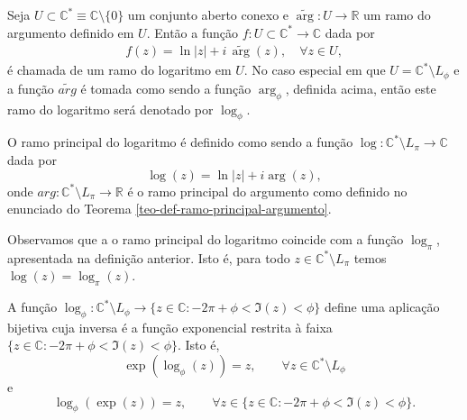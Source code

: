 \bigskip 



\begin{definicao}
\label{def-ramo-logaritmo}
Seja $U\subset \mathbb{C}^{*}\equiv \mathbb{C}\setminus\{0\}$ um conjunto aberto conexo e $\widetilde{\arg}:U\to\mathbb{R}$ um ramo do argumento definido em $U$. Então a função $f:U\subset \mathbb{C}^{*}\to\mathbb{C}$ dada por 
\begin{align}\label{def-eq-ramo-log}
f(z) = \ln |z|+ i\,\widetilde{\arg}(z), \quad \forall z\in U,
\end{align}
é chamada de um ramo do logaritmo em $U$. No caso especial em que  
$U=\mathbb{C}^{*}\setminus L_{\phi}$ 
e a função $\widetilde{arg}$ é tomada como sendo a função $\arg_{\phi}$, definida acima, então este ramo do logaritmo será denotado 
por $\log_{\phi}$. 
\end{definicao}



\begin{definicao}
\label{def-ramo-principal-log}
O ramo principal do logaritmo 
é definido como sendo a função 
$\log:\mathbb{C}^{*}\setminus L_{\pi}\to\mathbb{C}$
dada por 
\[
\log(z) = \ln |z| +i \arg(z),
\]
onde $arg: \mathbb{C}^{*}\setminus L_{\pi}\to \mathbb{R}$ 
é o ramo principal do argumento como definido no enunciado do Teorema
 \ref{teo-def-ramo-principal-argumento}. 
\end{definicao}


Observamos que a o ramo principal do logaritmo coincide com a função 
$\log_{\pi}$, apresentada na definição anterior. 
Isto é, para todo $z\in \mathbb{C}^{*}\setminus L_{\pi}$ 
temos $\log(z) = \log_{\pi}(z)$.


\begin{proposicao}\label{prop-explogz}
A função 
$\log_{\phi}:\mathbb{C}^{*}\setminus L_{\phi} 
\to \{z\in\mathbb{C}: -2\pi+\phi<\Im(z)<\phi \}$
define uma aplicação bijetiva cuja inversa é a função exponencial restrita à faixa 
$\{z\in\mathbb{C}: -2\pi+\phi<\Im(z)<\phi \}$. Isto é,
\[
\exp(\log_{\phi}(z))=z,  \qquad  \forall z\in \mathbb{C}^{*}\setminus L_{\phi}
\]
e 
\[
\log_{\phi}(\exp(z))=z,\qquad  \forall z\in \{z\in\mathbb{C}: -2\pi+\phi<\Im(z)<\phi \}.
\]
\end{proposicao}


